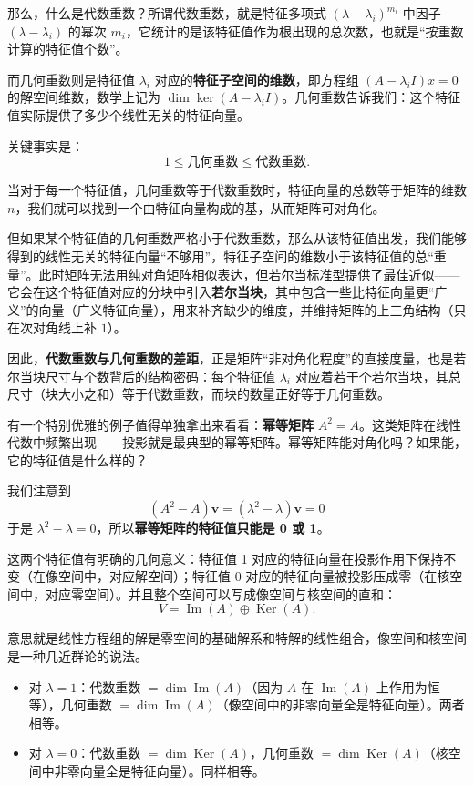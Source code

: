 \documentclass[UTF8]{ctexbook}
\begin{document}
那么，什么是代数重数？所谓代数重数，就是特征多项式 $(\lambda - \lambda_i)^{m_i}$ 中因子 $(\lambda - \lambda_i)$ 的幂次 $m_i$，它统计的是该特征值作为根出现的总次数，也就是“按重数计算的特征值个数”。

而几何重数则是特征值 $\lambda_i$ 对应的\textbf{特征子空间的维数}，即方程组 $(A - \lambda_i I)x = 0$ 的解空间维数，数学上记为 $\dim \ker(A - \lambda_i I)$。几何重数告诉我们：这个特征值实际提供了多少个线性无关的特征向量。

关键事实是：
\[
1 \le \text{几何重数} \le \text{代数重数}.
\]

当对于每一个特征值，几何重数等于代数重数时，特征向量的总数等于矩阵的维数 $n$，我们就可以找到一个由特征向量构成的基，从而矩阵可对角化。

但如果某个特征值的几何重数严格小于代数重数，那么从该特征值出发，我们能够得到的线性无关的特征向量“不够用”，特征子空间的维数小于该特征值的总“重量”。此时矩阵无法用纯对角矩阵相似表达，但若尔当标准型提供了最佳近似——它会在这个特征值对应的分块中引入\textbf{若尔当块}，其中包含一些比特征向量更“广义”的向量（广义特征向量），用来补齐缺少的维度，并维持矩阵的上三角结构（只在次对角线上补 $1$）。

因此，\textbf{代数重数与几何重数的差距}，正是矩阵“非对角化程度”的直接度量，也是若尔当块尺寸与个数背后的结构密码：每个特征值 $ \lambda_i $ 对应着若干个若尔当块，其总尺寸（块大小之和）等于代数重数，而块的数量正好等于几何重数。


有一个特别优雅的例子值得单独拿出来看看：\textbf{幂等矩阵} $A^2 = A$。这类矩阵在线性代数中频繁出现——投影就是最典型的幂等矩阵。幂等矩阵能对角化吗？如果能，它的特征值是什么样的？

我们注意到
\[
(A^2 - A)\mathbf{v} = (\lambda^2 - \lambda) \mathbf{v}=0
\]
于是 $\lambda^2 - \lambda=0$，所以\textbf{幂等矩阵的特征值只能是 0 或 1}。

这两个特征值有明确的几何意义：特征值 1 对应的特征向量在投影作用下保持不变（在像空间中，对应解空间）；特征值 0 对应的特征向量被投影压成零（在核空间中，对应零空间）。并且整个空间可以写成像空间与核空间的直和：
\[
V = \operatorname{Im}(A) \oplus \operatorname{Ker}(A).
\]

意思就是线性方程组的解是零空间的基础解系和特解的线性组合，像空间和核空间是一种几近群论的说法。

\begin{itemize}
\item 对 $\lambda = 1$：代数重数 $= \dim\operatorname{Im}(A)$（因为 $A$ 在 $\operatorname{Im}(A)$ 上作用为恒等），几何重数 $= \dim\operatorname{Im}(A)$（像空间中的非零向量全是特征向量）。两者相等。
\item 对 $\lambda = 0$：代数重数 $= \dim\operatorname{Ker}(A)$，几何重数 $= \dim\operatorname{Ker}(A)$（核空间中非零向量全是特征向量）。同样相等。
\end{itemize}
\end{document}
